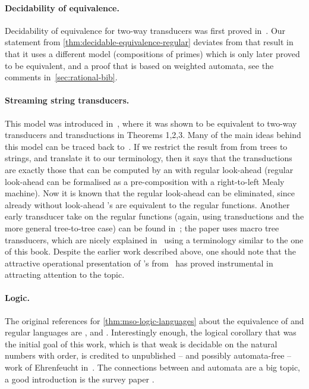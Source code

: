\paragraph*{Decidability of equivalence.}
Decidability of equivalence for two-way transducers was first proved in~\cite[Theorem 1]{gurari1982}. Our statement from \cref{thm:decidable-equivalence-regular} deviates from that result in that it uses a different model (compositions of primes) which is only later proved to be equivalent,  and a proof that is based on weighted automata,  see the comments in~\cref{sec:rational-bib}.


\paragraph*{Streaming string transducers.} This model was introduced in~\cite[Section 3]{alurCerny2010}, where it was shown to be equivalent to two-way transducers and \mso transductions in Theorems 1,2,3. Many of the main ideas behind this model can be traced back to~\cite[Theorem 17]{bloemEngelfriet2000}. If we restrict the result from \cite{bloemEngelfriet2000} from trees to strings, and translate it to our terminology, then it says that the \mso transductions are exactly those that can be computed by an \sst with regular look-ahead (regular look-ahead can be formalised as a pre-composition with a right-to-left Mealy machine). Now it is known that the regular look-ahead can be eliminated, since already without look-ahead \sst's are equivalent to the regular functions.  Another early transducer take on the regular functions (again, using \mso transductions and the more general tree-to-tree case) can be found in~\cite[Theorem 7.1]{engelfrietManeth1999}; the paper uses macro tree transducers, which are nicely explained in~\cite{nguyen2024} using a terminology similar to the one of this book. Despite the earlier work described above, one should note that the attractive operational presentation of \sst's from~\cite{alurCerny2010} has proved instrumental in attracting attention to the topic.


\paragraph*{Logic.}  The original references for \cref{thm:mso-logic-languages} about the equivalence of \mso and regular languages are  \cite[Theorems 1 and 2]{buchi1960},  \cite[Theorem on p. 35]{elgot1961} and \cite[]{trakhtenbrot1962}. Interestingly enough, the logical corollary that was the initial goal of this work, which is that weak \mso is decidable on the natural numbers with order, is credited to unpublished -- and possibly automata-free -- work of Ehrenfeucht in~\cite[Section 5.8]{elgot1961}. The connections between \mso and automata are a big topic, a good introduction is the survey paper \cite{thomas1997}. 

